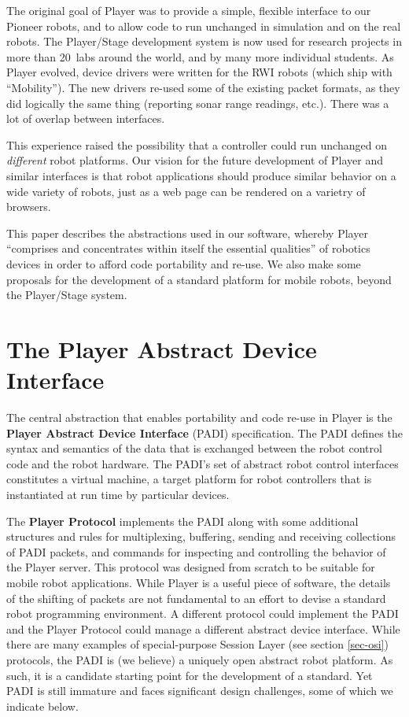 \documentclass[letterpaper, 10 pt, conference]{iros03}
\def\numlabs{20\ }
\begin{document}
  The original goal of Player was to provide a simple, flexible
  interface to our Pioneer robots, and to allow code to run unchanged
  in simulation and on the real robots. The Player/Stage development
  system is now used for research projects in more than \numlabs labs
  around the world, and by many more individual students. As Player
  evolved, device drivers were written for the RWI robots (which ship
  with ``Mobility''). The new drivers re-used some of the existing
  packet formats, as they did logically the same thing (reporting
  sonar range readings, etc.). There was a lot of overlap between
  interfaces.

  This experience raised the possibility that a controller could run
  unchanged on \emph{different} robot platforms. Our vision for the
  future development of Player and similar interfaces is that robot
  applications should produce similar behavior on a wide variety of
  robots, just as a web page can be rendered on a varietry of browsers.

This paper describes the abstractions used in our software, whereby
Player ``comprises and concentrates within itself the essential
qualities'' of robotics devices in order to afford code portability and re-use. 
We also make some proposals for the development of a standard platform
for mobile robots, beyond the Player/Stage system.


\section{The Player Abstract Device Interface}

 The central abstraction that enables portability and code re-use in
Player is the {\bf Player Abstract Device Interface} (PADI)
specification. The PADI defines the syntax and semantics of the data
that is exchanged between the robot control code and the robot
hardware. The PADI's set of abstract robot control interfaces
constitutes a virtual machine, a target platform for robot controllers
that is instantiated at run time by particular devices.

The {\bf Player Protocol} implements the PADI along with some
additional structures and rules for multiplexing, buffering, sending
and receiving collections of PADI packets, and commands for inspecting
and controlling the behavior of the Player server. This protocol was
designed from scratch to be suitable for mobile robot
applications. While Player is a useful piece of software, the details
of the shifting of packets are not fundamental to an effort to devise
a standard robot programming environment. A different protocol could
implement the PADI and the Player Protocol could manage a different
abstract device interface. While there are many examples of
special-purpose Session Layer (see section \ref{sec-osi}) protocols,
the PADI is (we believe) a uniquely open abstract robot platform. As
such, it is a candidate starting point for the development of a
standard. Yet PADI is still immature and faces significant design
challenges, some of which we indicate below.
\end{document}
